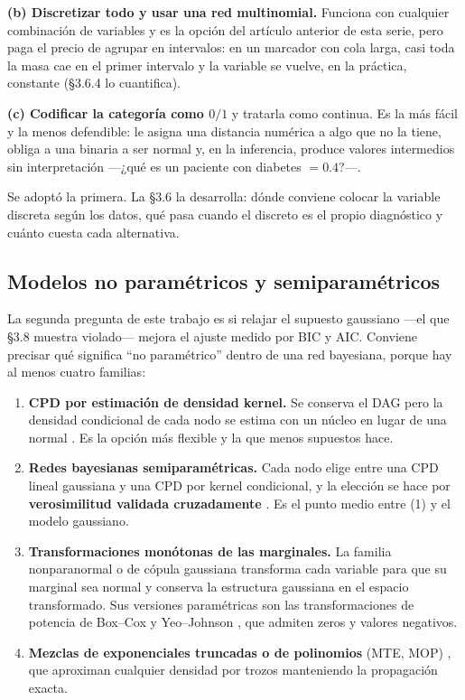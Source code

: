 \documentclass[11pt, a4paper]{article}
\begin{document}
\textbf{(b) Discretizar todo y usar una red multinomial.} Funciona con cualquier combinación de
variables y es la opción del artículo anterior de esta serie, pero paga el precio de agrupar en
intervalos: en un marcador con cola larga, casi toda la masa cae en el primer intervalo y la
variable se vuelve, en la práctica, constante (\S3.6.4 lo cuantifica).

\textbf{(c) Codificar la categoría como $0/1$} y tratarla como continua. Es la más fácil y la menos
defendible: le asigna una distancia numérica a algo que no la tiene, obliga a una binaria a ser
normal y, en la inferencia, produce valores intermedios sin interpretación —¿qué es un paciente con
diabetes $=0.4$?—.

Se adoptó la primera. La \S3.6 la desarrolla: dónde conviene colocar la variable discreta según
los datos, qué pasa cuando el discreto es el propio diagnóstico y cuánto cuesta cada alternativa.

\subsection{Modelos no paramétricos y semiparamétricos}
\label{sec:met-noparam}

La segunda pregunta de este trabajo es si relajar el supuesto gaussiano —el que \S3.8 muestra
violado— mejora el ajuste medido por BIC y AIC. Conviene precisar qué significa ``no paramétrico''
dentro de una red bayesiana, porque hay al menos cuatro familias:

\begin{enumerate}
    \item \textbf{CPD por estimación de densidad kernel.} Se conserva el DAG pero la densidad
        condicional de cada nodo se estima con un núcleo en lugar de una normal
        \cite{hofmann1996,silverman1986}. Es la opción más flexible y la que menos supuestos hace.
    \item \textbf{Redes bayesianas semiparamétricas.} Cada nodo elige entre una CPD lineal
        gaussiana y una CPD por kernel condicional, y la elección se hace por
        \textbf{verosimilitud validada cruzadamente} \cite{atienza2022}. Es el punto medio entre
        (1) y el modelo gaussiano.
    \item \textbf{Transformaciones monótonas de las marginales.} La familia nonparanormal o de
        cópula gaussiana \cite{liu2009,elidan2010} transforma cada variable para que su marginal
        sea normal y conserva la estructura gaussiana en el espacio transformado. Sus versiones
        paramétricas son las transformaciones de potencia de Box--Cox \cite{box1964} y
        Yeo--Johnson \cite{yeo2000}, que admiten zeros y valores negativos.
    \item \textbf{Mezclas de exponenciales truncadas o de polinomios} (MTE, MOP)
        \cite{moral2001,shenoy2011}, que aproximan cualquier densidad por trozos manteniendo la
        propagación exacta.
\end{enumerate}
\end{document}
